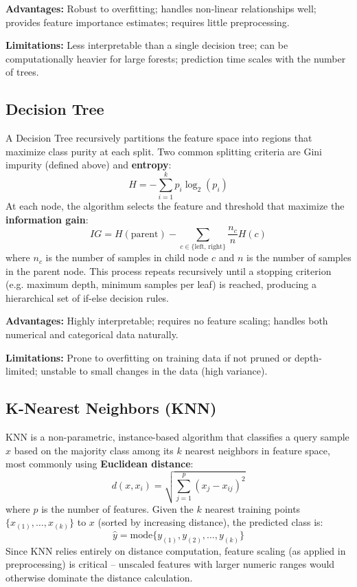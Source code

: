 \documentclass[12pt,a4paper]{article}
\begin{document}
\textbf{Advantages:} Robust to overfitting; handles non-linear relationships well; provides feature importance estimates; requires little preprocessing.

\textbf{Limitations:} Less interpretable than a single decision tree; can be computationally heavier for large forests; prediction time scales with the number of trees.

\subsection{Decision Tree}

A Decision Tree recursively partitions the feature space into regions that maximize class purity at each split. Two common splitting criteria are Gini impurity (defined above) and \textbf{entropy}:
\[
H = -\sum_{i=1}^{k} p_i \log_2(p_i)
\]
At each node, the algorithm selects the feature and threshold that maximize the \textbf{information gain}:
\[
IG = H(\text{parent}) - \sum_{c \in \{\text{left, right}\}} \frac{n_c}{n} H(c)
\]
where $n_c$ is the number of samples in child node $c$ and $n$ is the number of samples in the parent node. This process repeats recursively until a stopping criterion (e.g. maximum depth, minimum samples per leaf) is reached, producing a hierarchical set of if-else decision rules.

\textbf{Advantages:} Highly interpretable; requires no feature scaling; handles both numerical and categorical data naturally.

\textbf{Limitations:} Prone to overfitting on training data if not pruned or depth-limited; unstable to small changes in the data (high variance).

\subsection{K-Nearest Neighbors (KNN)}

KNN is a non-parametric, instance-based algorithm that classifies a query sample $x$ based on the majority class among its $k$ nearest neighbors in feature space, most commonly using \textbf{Euclidean distance}:
\[
d(x, x_i) = \sqrt{\sum_{j=1}^{p}(x_j - x_{ij})^2}
\]
where $p$ is the number of features. Given the $k$ nearest training points $\{x_{(1)}, \dots, x_{(k)}\}$ to $x$ (sorted by increasing distance), the predicted class is:
\[
\hat{y} = \text{mode}\{y_{(1)}, y_{(2)}, \dots, y_{(k)}\}
\]
Since KNN relies entirely on distance computation, feature scaling (as applied in preprocessing) is critical -- unscaled features with larger numeric ranges would otherwise dominate the distance calculation.
\end{document}
